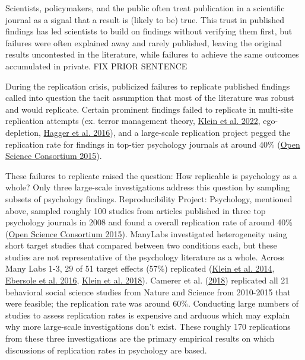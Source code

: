 \documentclass[
  english,
  a4paper,
]{article}
\begin{document}
Scientists, policymakers, and the public often treat publication in a scientific journal as a signal that a result is (likely to be) true. This trust in published findings has led scientists to build on findings without verifying them first, but failures were often explained away and rarely published, leaving the original results uncontested in the literature, while failures to achieve the same outcomes accumulated in private. FIX PRIOR SENTENCE

During the replication crisis, publicized failures to replicate published findings called into question the tacit assumption that most of the literature was robust and would replicate. Certain prominent findings failed to replicate in multi-site replication attempts (ex. terror management theory, \protect\hyperlink{ref-klein2022}{Klein et al. 2022}, ego-depletion, \protect\hyperlink{ref-hagger2016}{Hagger et al. 2016}), and a large-scale replication project pegged the replication rate for findings in top-tier psychology journals at around 40\% (\protect\hyperlink{ref-openscienceconsortium2015}{Open Science Consortium 2015}).

These failures to replicate raised the question: How replicable is psychology as a whole? Only three large-scale investigations address this question by sampling subsets of psychology findings. Reproducibility Project: Psychology, mentioned above, sampled roughly 100 studies from articles published in three top psychology journals in 2008 and found a overall replication rate of around 40\% (\protect\hyperlink{ref-openscienceconsortium2015}{Open Science Consortium 2015}). ManyLabs investigated heterogeneity using short target studies that compared between two conditions each, but these studies are not representative of the psychology literature as a whole. Across Many Labs 1-3, 29 of 51 target effects (57\%) replicated (\protect\hyperlink{ref-klein2014}{Klein et al. 2014}, \protect\hyperlink{ref-ebersole2016}{Ebersole et al. 2016}, \protect\hyperlink{ref-klein2018}{Klein et al. 2018}). Camerer et al. (\protect\hyperlink{ref-camerer2018}{2018}) replicated all 21 behavioral social science studies from Nature and Science from 2010-2015 that were feasible; the replication rate was around 60\%. Conducting large numbers of studies to assess replication rates is expensive and arduous which may explain why more large-scale investigations don't exist. These roughly 170 replications from these three investigations are the primary empirical results on which discussions of replication rates in psychology are based.
\end{document}

